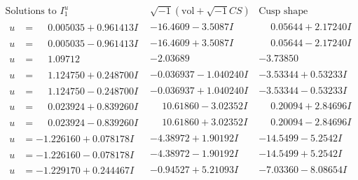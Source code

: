 \documentclass[1p]{elsarticle_modified}
\theoremstyle{definition}
\newcommand{\I}{\sqrt{-1}}
\begin{document}
$$\begin{array}{c|c|c}  
\text{Solutions to }I^u_{1}& \I (\text{vol} + \sqrt{-1}CS) & \text{Cusp shape}\\
 \hline 
\begin{aligned}
u &= \phantom{-}0.005035 + 0.961413 I\end{aligned}
 & -16.4609 - 3.5087 I & \phantom{-}0.05644 + 2.17240 I \\ \hline\begin{aligned}
u &= \phantom{-}0.005035 - 0.961413 I\end{aligned}
 & -16.4609 + 3.5087 I & \phantom{-}0.05644 - 2.17240 I \\ \hline\begin{aligned}
u &= \phantom{-}1.09712\phantom{ +0.000000I}\end{aligned}
 & -2.03689\phantom{ +0.000000I} & -3.73850\phantom{ +0.000000I} \\ \hline\begin{aligned}
u &= \phantom{-}1.124750 + 0.248700 I\end{aligned}
 & -0.036937 - 1.040240 I & -3.53344 + 0.53233 I \\ \hline\begin{aligned}
u &= \phantom{-}1.124750 - 0.248700 I\end{aligned}
 & -0.036937 + 1.040240 I & -3.53344 - 0.53233 I \\ \hline\begin{aligned}
u &= \phantom{-}0.023924 + 0.839260 I\end{aligned}
 & \phantom{-}10.61860 - 3.02352 I & \phantom{-}0.20094 + 2.84696 I \\ \hline\begin{aligned}
u &= \phantom{-}0.023924 - 0.839260 I\end{aligned}
 & \phantom{-}10.61860 + 3.02352 I & \phantom{-}0.20094 - 2.84696 I \\ \hline\begin{aligned}
u &= -1.226160 + 0.078178 I\end{aligned}
 & -4.38972 + 1.90192 I & -14.5499 - 5.2542 I \\ \hline\begin{aligned}
u &= -1.226160 - 0.078178 I\end{aligned}
 & -4.38972 - 1.90192 I & -14.5499 + 5.2542 I \\ \hline\begin{aligned}
u &= -1.229170 + 0.244467 I\end{aligned}
 & -0.94527 + 5.21093 I & -7.03360 - 8.08654 I \\ \hline\begin{aligned}

\end{aligned}
\end{array}$$
\end{document}
